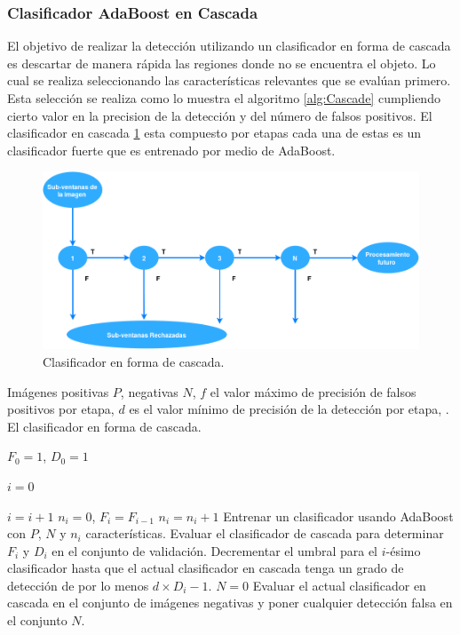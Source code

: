 \subsubsection{Clasificador AdaBoost en Cascada}\label{sssec:AdaboostCascade}   

El objetivo de realizar la detección utilizando un clasificador en forma de cascada es descartar de manera rápida las regiones donde no se encuentra el objeto. Lo cual se realiza seleccionando las características relevantes que se evalúan primero.  
Esta selección se realiza como lo muestra el algoritmo \ref{alg:Cascade}  cumpliendo cierto valor en la precision  de la detección y del número de falsos positivos. 
El clasificador en cascada \ref{fig:Cascade} esta compuesto por etapas cada una de estas es un clasificador fuerte que es entrenado por medio de AdaBoost. 

\begin{figure}[h!]
\begin{center}
\includegraphics[scale=.45]{./Figures/DCascade.png}
\end{center}
\caption{Clasificador en forma de cascada.}
\label{fig:Cascade}
\end{figure} 

\begin{algorithm}[h!]
\begin{algorithmic}[1]
\REQUIRE Imágenes positivas $P$, negativas $N$, $f$ el valor máximo de precisión de falsos positivos por etapa, $d$ es el valor mínimo de precisión de la detección por etapa, . 
\ENSURE El clasificador en forma de cascada.  

\STATE  $F_0 = 1$, $D_0=1$

\STATE  $i=0$ 

	\STATE $i=i+1$
	\STATE $n_i=0$, $F_i=F_{i-1}$
		\STATE $n_i = n_i +1$ 
		\STATE Entrenar un clasificador usando AdaBoost con $P$, $N$ y $n_i$ características. 
		\STATE Evaluar el clasificador de cascada para determinar $F_i$ y $D_i$ en el conjunto de validación. 
		\STATE Decrementar el umbral para el $i$-ésimo clasificador hasta que el actual clasificador en cascada tenga un grado 			de detección de por lo menos $d \times D_i-1$.
	\ENDWHILE
	\STATE $N=0$ 
		\STATE Evaluar el actual clasificador en cascada en el conjunto de imágenes negativas y poner cualquier detección 				falsa en el conjunto $N$.
	\ENDIF

\ENDWHILE    
\caption{}\label{alg:Cascade} 
\end{algorithmic}
\end{algorithm} 


